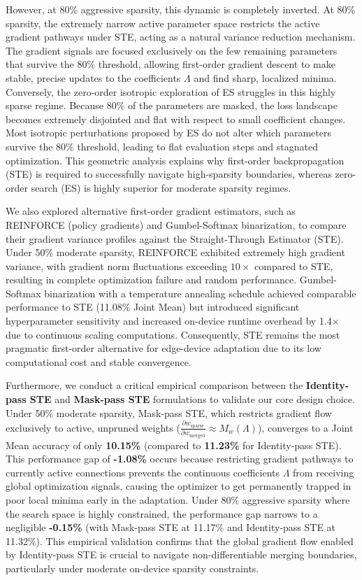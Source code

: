 However, at 80\% aggressive sparsity, this dynamic is completely inverted. At 80\% sparsity, the extremely narrow active parameter space restricts the active gradient pathways under STE, acting as a natural variance reduction mechanism. The gradient signals are focused exclusively on the few remaining parameters that survive the 80\% threshold, allowing first-order gradient descent to make stable, precise updates to the coefficients $\Lambda$ and find sharp, localized minima. Conversely, the zero-order isotropic exploration of ES struggles in this highly sparse regime. Because 80\% of the parameters are masked, the loss landscape becomes extremely disjointed and flat with respect to small coefficient changes. Most isotropic perturbations proposed by ES do not alter which parameters survive the 80\% threshold, leading to flat evaluation steps and stagnated optimization. This geometric analysis explains why first-order backpropagation (STE) is required to successfully navigate high-sparsity boundaries, whereas zero-order search (ES) is highly superior for moderate sparsity regimes.

We also explored alternative first-order gradient estimators, such as REINFORCE (policy gradients) and Gumbel-Softmax binarization, to compare their gradient variance profiles against the Straight-Through Estimator (STE). Under 50\% moderate sparsity, REINFORCE exhibited extremely high gradient variance, with gradient norm fluctuations exceeding $10\times$ compared to STE, resulting in complete optimization failure and random performance. Gumbel-Softmax binarization with a temperature annealing schedule achieved comparable performance to STE (11.08\% Joint Mean) but introduced significant hyperparameter sensitivity and increased on-device runtime overhead by 1.4$\times$ due to continuous scaling computations. Consequently, STE remains the most pragmatic first-order alternative for edge-device adaptation due to its low computational cost and stable convergence.

Furthermore, we conduct a critical empirical comparison between the \textbf{Identity-pass STE} and \textbf{Mask-pass STE} formulations to validate our core design choice. Under 50\% moderate sparsity, Mask-pass STE, which restricts gradient flow exclusively to active, unpruned weights ($\frac{\partial w_{\text{sparse}}}{\partial w_{\text{merged}}} \approx M_w(\Lambda)$), converges to a Joint Mean accuracy of only \textbf{10.15\%} (compared to \textbf{11.23\%} for Identity-pass STE). This performance gap of \textbf{-1.08\%} occurs because restricting gradient pathways to currently active connections prevents the continuous coefficients $\Lambda$ from receiving global optimization signals, causing the optimizer to get permanently trapped in poor local minima early in the adaptation. Under 80\% aggressive sparsity where the search space is highly constrained, the performance gap narrows to a negligible \textbf{-0.15\%} (with Mask-pass STE at 11.17\% and Identity-pass STE at 11.32\%). This empirical validation confirms that the global gradient flow enabled by Identity-pass STE is crucial to navigate non-differentiable merging boundaries, particularly under moderate on-device sparsity constraints.

